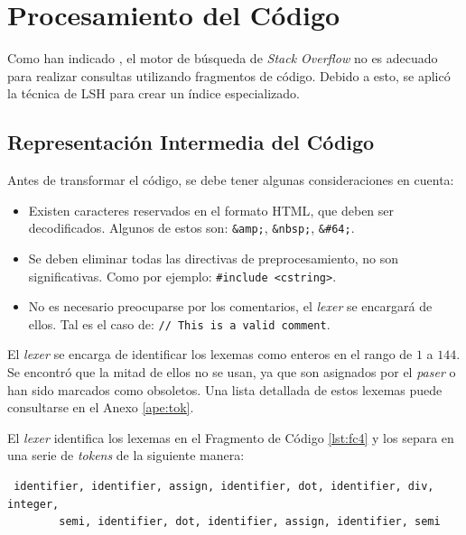 \section{Procesamiento del Código}
\label{sec:DesProCod}

Como han indicado \cite{monperrus:hal-00987395},
el motor de búsqueda de \textit{Stack Overflow} no es adecuado para realizar consultas utilizando fragmentos de código.
Debido a esto, se aplicó la técnica de \ac{LSH} para crear un índice especializado.

\subsection{Representación Intermedia del Código}
\label{subsec:DesIntCod}

Antes de transformar el código, se debe tener algunas consideraciones en cuenta:

\begin{itemize}
  \item Existen caracteres reservados en el formato \ac{HTML}, que deben ser decodificados.
  Algunos de estos son: \lstinline{&amp;}, \lstinline{&nbsp;}, \lstinline{&#64;}.

  \item Se deben eliminar todas las directivas de preprocesamiento, no son significativas.
  Como por ejemplo: \lstinline{#include <cstring>}.
  
  \item No es necesario preocuparse por los comentarios, el \textit{lexer} se encargará de ellos.
  Tal es el caso de: \lstinline{// This is a valid comment}.
\end{itemize}

El \textit{lexer} se encarga de identificar los lexemas como enteros en el rango de $1$ a $144$.
Se encontró que la mitad de ellos no se usan, ya que son asignados por el \textit{paser}
o han sido marcados como obsoletos. Una lista detallada de estos lexemas
puede consultarse en el Anexo \ref{ape:tok}.

\newpage
El \textit{lexer} identifica los lexemas en el Fragmento de Código \ref{lst:fc4} 
y los separa en una serie de \textit{tokens} de la siguiente manera:

\begin{verbatim}
 identifier, identifier, assign, identifier, dot, identifier, div, integer,
        semi, identifier, dot, identifier, assign, identifier, semi
\end{verbatim}

